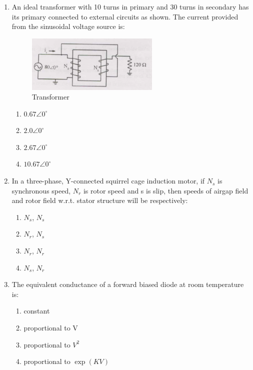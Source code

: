 \documentclass[journal,cmex10]{IEEEtran}
\theoremstyle{remark}
\numberwithin{equation}{enumi}
\numberwithin{figure}{enumi}
\begin{document}
\begin{enumerate}[label=\arabic*)]
    \item An ideal transformer with 10 turns in primary and 30 turns in secondary has its primary connected to external circuits as shown. The current provided from the sinusoidal voltage source is:
    \begin{figure}[htbp]
  \centering
  \includegraphics[width=0.6\textwidth]{figs/C/fig2.png}
  \caption{Transformer}
  \label{C/figs2.png}
\end{figure}
    \bigskip
    \hfill {}
    \begin{enumerate}[label=\alph*)]
        \item $0.67\angle 0^\circ$
        \item $2.0\angle 0^\circ$
        \item $2.67\angle 0^\circ$
        \item $10.67\angle 0^\circ$
    \end{enumerate}
    \bigskip

    \item In a three-phase, Y-connected squirrel cage induction motor, if $N_s$ is synchronous speed, $N_r$ is rotor speed and s is slip, then speeds of airgap field and rotor field w.r.t. stator structure will be respectively:
    \bigskip
    \hfill {}
    \begin{enumerate}[label=\alph*)]
        \item $N_s$, $N_s$
        \item $N_r$, $N_s$
        \item $N_r$, $N_r$
        \item $N_s$, $N_r$
    \end{enumerate}
    \bigskip

    \item The equivalent conductance of a forward biased diode at room temperature is:
    \bigskip
    \hfill {}
    \begin{enumerate}[label=\alph*)]
        \item constant
        \item proportional to V
        \item proportional to $V^2$
        \item proportional to $\exp(KV)$
    \end{enumerate}
    \newpage


\end{enumerate}
\end{document}

